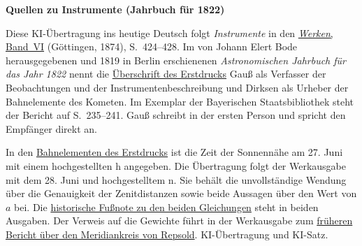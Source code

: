 \clearpage\thispagestyle{empty}
\begin{center}\textbf{Quellen zu Instrumente (Jahrbuch für 1822)}\end{center}
\noindent Diese KI-Übertragung ins heutige Deutsch folgt \textit{Instrumente} in den \href{https://gdz.sub.uni-goettingen.de/id/PPN236007467}{\textit{Werken}, Band~VI} (Göttingen, 1874), S.~424--428. Im von Johann Elert Bode herausgegebenen und 1819 in Berlin erschienenen \textit{Astronomischen Jahrbuch für das Jahr 1822} nennt die \href{https://api.digitale-sammlungen.de/iiif/image/v2/bsb10538351_00241/full/1600,/0/default.jpg}{Überschrift des Erstdrucks} Gauß als Verfasser der Beobachtungen und der Instrumentenbeschreibung und Dirksen als Urheber der Bahnelemente des Kometen. Im Exemplar der Bayerischen Staatsbibliothek steht der Bericht auf S.~235--241. Gauß schreibt in der ersten Person und spricht den Empfänger direkt an.
\par\smallskip\noindent In den \href{https://api.digitale-sammlungen.de/iiif/image/v2/bsb10538351_00242/full/1600,/0/default.jpg}{Bahnelementen des Erstdrucks} ist die Zeit der Sonnennähe am 27. Juni mit einem hochgestellten h angegeben. Die Übertragung folgt der Werkausgabe mit dem 28. Juni und hochgestelltem n. Sie behält die unvollständige Wendung über die Genauigkeit der Zenitdistanzen sowie beide Aussagen über den Wert von \(a\) bei. Die \href{https://api.digitale-sammlungen.de/iiif/image/v2/bsb10538351_00246/full/1600,/0/default.jpg}{historische Fußnote zu den beiden Gleichungen} steht in beiden Ausgaben. Der Verweis auf die Gewichte führt in der Werkausgabe zum \hyperlink{native-415}{früheren Bericht über den Meridiankreis von Repsold}. KI-Übertragung und KI-Satz.
\clearpage
